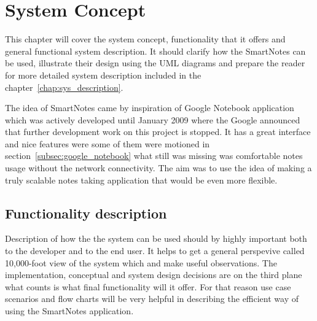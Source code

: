 \chapter{System Concept}\label{chap:concept}
This chapter will cover the system concept, functionality that it offers and general functional system description. It should clarify how the SmartNotes can be used, illustrate their design using the UML diagrams and prepare the reader for more detailed system description included in the chapter~\ref{chap:sys_description}.

The idea of SmartNotes came by inspiration of Google Notebook application which was actively developed until January 2009 where the Google announced that further development work on this project is stopped. It has a great interface and nice features were some of them were motioned in section~\ref{subsec:google_notebook} what still was missing was comfortable notes usage without the network connectivity. The aim was to use the idea of making a truly scalable notes taking application that would be even more flexible.

\section{Functionality description}\label{sec:functionality_descr} 
Description of how the the system can be used should by highly important both to the developer and to the end user. It helps to get a general perspevive called 10,000-foot view\cite[page 49]{uml_use_case} of the system which and make useful observations. The implementation, conceptual and system design decisions are on the third plane what counts is what final functionality will it offer. For that reason use case scenarios and flow charts will be very helpful in describing the efficient way of using the SmartNotes application.

